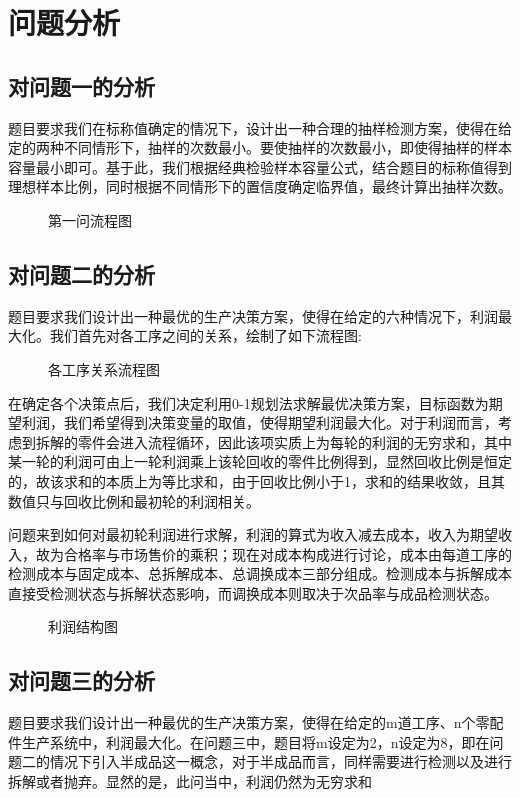 \documentclass[withoutpreface,bwprint]{cumcmthesis}
\begin{document}
\newpage
\section{问题分析}
\subsection{对问题一的分析}
题目要求我们在标称值确定的情况下，设计出一种合理的抽样检测方案，使得在给定的两种不同情形下，抽样的次数最小。要使抽样的次数最小，即使得抽样的样本容量最小即可。基于此，我们根据经典检验样本容量公式，结合题目的标称值得到理想样本比例，同时根据不同情形下的置信度确定临界值，最终计算出抽样次数。
\begin{figure}[h]
   \centering
   \resizebox{0.8\linewidth}{!}{}
   \caption{第一问流程图}
   \label{fig:one}
\end{figure}
\subsection{对问题二的分析}
题目要求我们设计出一种最优的生产决策方案，使得在给定的六种情况下，利润最大化。我们首先对各工序之间的关系，绘制了如下流程图:
\begin{figure}[h]
   \centering
   \resizebox{0.9\linewidth}{!}{}
   \caption{各工序关系流程图}
   \label{fig:one}
\end{figure}

在确定各个决策点后，我们决定利用0-1规划法求解最优决策方案，目标函数为期望利润，我们希望得到决策变量的取值，使得期望利润最大化。对于利润而言，考虑到拆解的零件会进入流程循环，因此该项实质上为每轮的利润的无穷求和，其中某一轮的利润可由上一轮利润乘上该轮回收的零件比例得到，显然回收比例是恒定的，故该求和的本质上为等比求和，由于回收比例小于1，求和的结果收敛，且其数值只与回收比例和最初轮的利润相关。

问题来到如何对最初轮利润进行求解，利润的算式为收入减去成本，收入为期望收入，故为合格率与市场售价的乘积；现在对成本构成进行讨论，成本由每道工序的检测成本与固定成本、总拆解成本、总调换成本三部分组成。检测成本与拆解成本直接受检测状态与拆解状态影响，而调换成本则取决于次品率与成品检测状态。
\begin{figure}[h]
   \centering
   \resizebox{0.5\linewidth}{!}{}
   \caption{利润结构图}
   \label{fig:one}
\end{figure}
\subsection{对问题三的分析}
题目要求我们设计出一种最优的生产决策方案，使得在给定的m道工序、n个零配件生产系统中，利润最大化。在问题三中，题目将m设定为2，n设定为8，即在问题二的情况下引入半成品这一概念，对于半成品而言，同样需要进行检测以及进行拆解或者抛弃。显然的是，此问当中，利润仍然为无穷求和
\end{document}
